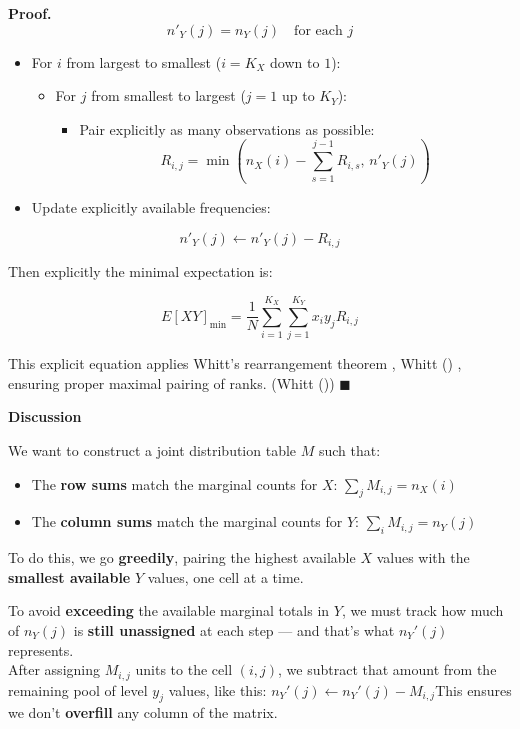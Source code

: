 \documentclass[
  12pt,
]{article}
\providecommand{\tightlist}{%
  \setlength{\itemsep}{0pt}\setlength{\parskip}{0pt}}
\theoremstyle{plain}
\theoremstyle{definition}
\renewenvironment{proof}
   {\par\noindent\textbf{Proof.}\ }
   {\hfill$\blacksquare$\par}
\theoremstyle{remark}
\begin{document}
\begin{proof}
\[n'_Y(j)=n_Y(j)\quad\text{for each }j\]

\begin{itemize}
\item
  For \(i\) from largest to smallest (\(i=K_X\) down to \(1\)):

  \begin{itemize}
  \tightlist
  \item
    For \(j\) from smallest to largest (\(j=1\) up to \(K_Y\)):

    \begin{itemize}
    \tightlist
    \item
      Pair explicitly as many observations as possible:
      \[R_{i,j}=\min\left(n_X(i)-\sum_{s=1}^{j-1}R_{i,s},\, n'_Y(j)\right)\]
    \end{itemize}
  \end{itemize}
\item
  Update explicitly available frequencies:
\end{itemize}

\[n'_Y(j)\leftarrow n'_Y(j)-R_{i,j}\]

Then explicitly the minimal expectation is:

\[E[XY]_{\text{min}}=\frac{1}{N}\sum_{i=1}^{K_X}\sum_{j=1}^{K_Y} x_i y_j R_{i,j}\]

This explicit equation applies Whitt's rearrangement theorem , Whitt
() , ensuring proper maximal
pairing of ranks. (Whitt ())
\end{proof}

\textbf{Discussion}

We want to construct a joint distribution table \(M\) such that:

\begin{itemize}
\item
  The \textbf{row sums} match the marginal counts for \(X\):
  \(\sum_j M_{i,j} = n_X(i)\)
\item
  The \textbf{column sums} match the marginal counts for \(Y\):
  \(\sum_i M_{i,j} = n_Y(j)\)
\end{itemize}

To do this, we go \textbf{greedily}, pairing the highest available \(X\)
values with the \textbf{smallest available} \(Y\) values, one cell at a
time.

To avoid \textbf{exceeding} the available marginal totals in \(Y\), we
must track how much of \(n_Y(j)\) is \textbf{still unassigned} at each
step --- and that's what \(n_Y'(j)\) represents.\\
After assigning \(M_{i,j}\) units to the cell \((i,j)\), we subtract
that amount from the remaining pool of level \(y_j\) values, like this:
\(n_Y'(j) \leftarrow n_Y'(j) - M_{i,j}\)This ensures we don't
\textbf{overfill} any column of the matrix.
\end{document}
